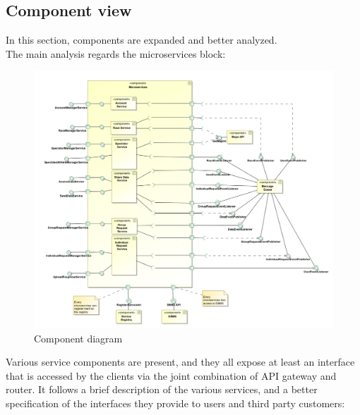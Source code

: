 \subsection{Component view}
In this section, components are expanded and better analyzed. \\
The main analysis regards the microservices block: 
\begin{figure}[H]
\includegraphics[width=\linewidth]{Images/componentdiagram.pdf}
\caption{ Component diagram }
\label{fig:componentdiagram}
\end{figure}
Various service components are present, and they all expose at least an interface that is accessed by the
clients via the joint combination of API gateway and router.
It follows a brief description of the various services, and a better specification of the interfaces they provide to users and third party customers:
